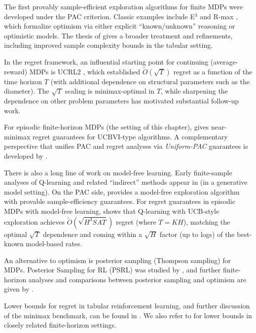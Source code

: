 The first provably sample-efficient exploration algorithms for finite MDPs were
developed under the PAC criterion. Classic examples include E$^3$ \citep{kearns2002optimal}
and R-max \citep{brafman2002r}, which formalize optimism via either explicit
``known/unknown'' reasoning or optimistic models. The thesis of \citep{kakade2003sample}
gives a broader treatment and refinements, including improved sample complexity bounds in
the tabular setting.

In the regret framework, an influential starting point for continuing (average-reward)
MDPs is UCRL2 \citep{jaksch2010optimal}, which established $\tilde O(\sqrt{T})$ regret as a
function of the time horizon $T$ (with additional dependence on structural parameters such
as the diameter). The $\sqrt{T}$ scaling is minimax-optimal in $T$, while sharpening the
dependence on other problem parameters has motivated substantial follow-up work.

For episodic finite-horizon MDPs (the setting of this chapter), \citet{pmlr-v70-azar17a}
gives near-minimax regret guarantees for UCBVI-type algorithms. A complementary perspective
that unifies PAC and regret analyses via \emph{Uniform-PAC} guarantees is developed by
\citet{DBLP:conf/nips/DannLB17}.

There is also a long line of work on model-free learning. Early finite-sample analyses of
Q-learning and related ``indirect'' methods appear in \citet{DBLP:conf/nips/KearnsS98a} (in a generative model setting).
On the PAC side, \citet{strehl2006pac} provides a model-free exploration algorithm with
provable sample-efficiency guarantees. For regret guarantees in episodic MDPs with
model-free learning, \citet{jin2018qlearning} shows that Q-learning with UCB-style
exploration achieves $\tilde O(\sqrt{H^3 S A T})$ regret (where $T=KH$), matching the
optimal $\sqrt{T}$ dependence and coming within a $\sqrt{H}$ factor (up to logs) of the
best-known model-based rates.

An alternative to optimism is posterior sampling (Thompson sampling) for MDPs.
Posterior Sampling for RL (PSRL) was studied by \citet{osband2013psrl}, and further
finite-horizon analyses and comparisons between posterior sampling and optimism are given
by \citet{pmlr-v70-osband17a}.

Lower bounds for regret in tabular reinforcement learning, and further discussion of the
minimax benchmark, can be found in \citet{pmlr-v70-azar17a,osband2016on}. We also refer to \citet{dann2015sample} for lower bounds in closely related finite-horizon settings.

